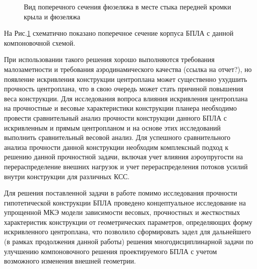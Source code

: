 \begin{figure}[ht]
\captionsetup{justification=centering}
\centering

\caption{Вид поперечного сечения фюзеляжа в месте стыка передней кромки крыла и фюзеляжа}
\label{fig:OriginalSectionWithEngine}
\end{figure}



На Рис.\ref{fig:OriginalSectionWithEngine} схематично показано поперечное сечение корпуса БПЛА с данной компоновочной схемой.

При использовании такого решения хорошо выполняются требования малозаметности и требования аэродинамического качества (ссылка на отчет?), но появление искривления конструкции центроплана может существенно ухудшить прочность центроплана, что в свою очередь может стать причиной повышения веса конструкции. Для исследования вопроса влияния искривления центроплана на прочностные и весовые характеристики конструкции планера необходимо провести сравнительный анализ прочности конструкции данного БПЛА с искривленным и прямым центропланом и на основе этих исследований выполнить сравнительный весовой анализ. Для успешного сравнительного анализа прочности данной конструкции необходим комплексный подход к решению данной прочностной задачи, включая учет влияния аэроупругости на перераспределение внешних нагрузок и учет перераспределения потоков усилий внутри конструкции для различных КСС.










Для решения поставленной задачи в работе помимо исследования прочности гипотетической конструкции БПЛА проведено концептуальное исследование на упрощенной МКЭ модели зависимости весовых, прочностных и жесткостных характеристик конструкции от геометрических параметров, определяющих форму искривленного центроплана, что позволило сформировать задел для дальнейшего (в рамках продолжения данной работы) решения многодисциплинарной задачи по улучшению компоновочного решения проектируемого БПЛА с учетом возможного изменения внешней геометрии. 


